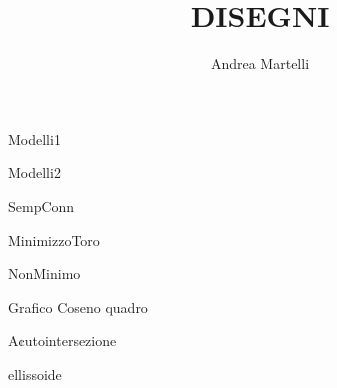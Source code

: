 \documentclass{article}
\title{DISEGNI}
\author{Andrea Martelli}
\begin{document}
	Modelli1
	
	
	\newpage
	
	Modelli2
	
	
	\newpage
	
	SempConn
	
	
	\newpage
	
	MinimizzoToro
	
	\newpage
	
	NonMinimo
	
	
	\newpage
	
	Grafico Coseno quadro
	
	\newpage
	
	A¢utointersezione
	
	\newpage
	
	ellissoide
	
	
	
\end{document}
